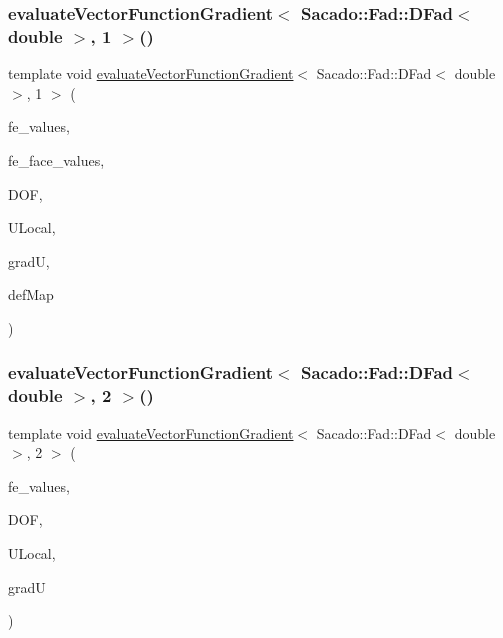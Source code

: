 \subsubsection{\texorpdfstring{evaluate\+Vector\+Function\+Gradient$<$ Sacado\+::\+Fad\+::\+D\+Fad$<$ double $>$, 1 $>$()}{evaluateVectorFunctionGradient< Sacado::Fad::DFad< double >, 1 >()}\hspace{0.1cm}{\footnotesize\ttfamily [4/4]}}
{\footnotesize\ttfamily template void \mbox{\hyperlink{group___evaluation_functions_ga9608539d601a91aff1ba01ccc720fbe0}{evaluate\+Vector\+Function\+Gradient}}$<$ Sacado\+::\+Fad\+::\+D\+Fad$<$ double $>$, 1 $>$ (\begin{DoxyParamCaption}\item[{const F\+E\+Values$<$ 1 $>$ \&}]{fe\+\_\+values,  }\item[{const F\+E\+Face\+Values$<$ 1 $>$ \&}]{fe\+\_\+face\+\_\+values,  }\item[{unsigned int}]{D\+OF,  }\item[{Table$<$ 1, Sacado\+::\+Fad\+::\+D\+Fad$<$ double $>$$>$ \&}]{U\+Local,  }\item[{Table$<$ 3, Sacado\+::\+Fad\+::\+D\+Fad$<$ double $>$$>$ \&}]{gradU,  }\item[{\mbox{\hyperlink{structdeformation_map}{deformation\+Map}}$<$ Sacado\+::\+Fad\+::\+D\+Fad$<$ double $>$, 1 $>$ \&}]{def\+Map }\end{DoxyParamCaption})}

\mbox{\label{function_evaluations_8cc_afadde85222d3c01dcc7555e0c47d4aa9}} 
\subsubsection{\texorpdfstring{evaluate\+Vector\+Function\+Gradient$<$ Sacado\+::\+Fad\+::\+D\+Fad$<$ double $>$, 2 $>$()}{evaluateVectorFunctionGradient< Sacado::Fad::DFad< double >, 2 >()}\hspace{0.1cm}{\footnotesize\ttfamily [1/4]}}
{\footnotesize\ttfamily template void \mbox{\hyperlink{group___evaluation_functions_ga9608539d601a91aff1ba01ccc720fbe0}{evaluate\+Vector\+Function\+Gradient}}$<$ Sacado\+::\+Fad\+::\+D\+Fad$<$ double $>$, 2 $>$ (\begin{DoxyParamCaption}\item[{const F\+E\+Values$<$ 2 $>$ \&}]{fe\+\_\+values,  }\item[{unsigned int}]{D\+OF,  }\item[{Table$<$ 1, Sacado\+::\+Fad\+::\+D\+Fad$<$ double $>$$>$ \&}]{U\+Local,  }\item[{Table$<$ 3, Sacado\+::\+Fad\+::\+D\+Fad$<$ double $>$$>$ \&}]{gradU }\end{DoxyParamCaption})}


